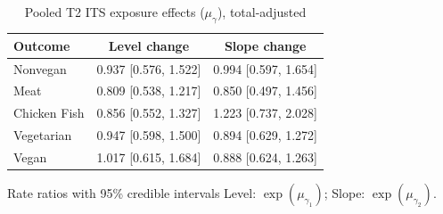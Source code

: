 \begin{table}[H]
\centering
\caption{Pooled T2 ITS exposure effects ($\mu_\gamma$), total-adjusted}
\label{tab:a3_t2_mu_gamma_adj}
\begin{tabular}{lcc}
\toprule
Outcome & Level change & Slope change \\
\midrule
Nonvegan & 0.937 [0.576, 1.522] & 0.994 [0.597, 1.654] \\
Meat & 0.809 [0.538, 1.217] & 0.850 [0.497, 1.456] \\
Chicken Fish & 0.856 [0.552, 1.327] & 1.223 [0.737, 2.028] \\
Vegetarian & 0.947 [0.598, 1.500] & 0.894 [0.629, 1.272] \\
Vegan & 1.017 [0.615, 1.684] & 0.888 [0.624, 1.263] \\
\bottomrule
\end{tabular}
\par\smallskip\footnotesize Rate ratios with 95\% credible intervals Level: $\exp(\mu_{\gamma_1})$; Slope: $\exp(\mu_{\gamma_2})$.
\end{table}
